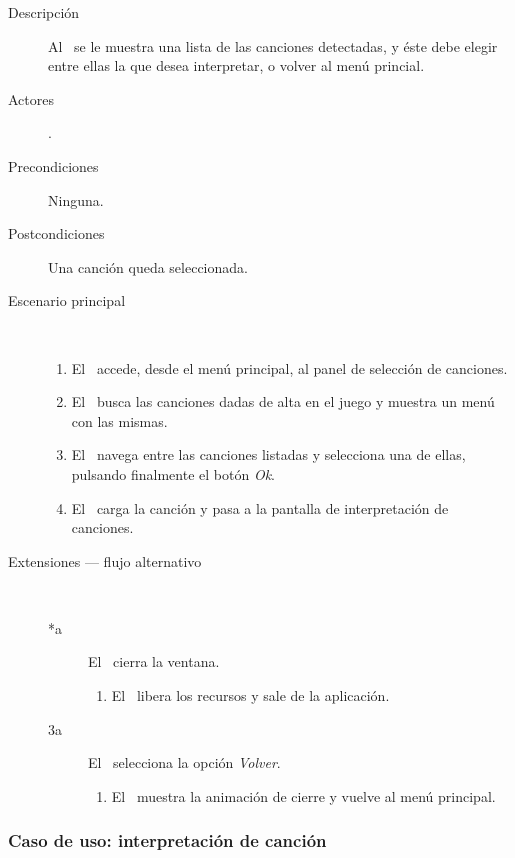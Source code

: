 \begin{description}
\item [Descripción] Al \jugador\ se le muestra una lista de las canciones
  detectadas, y éste debe elegir entre ellas la que desea interpretar, o volver
  al menú princial.
\item [Actores] \jugador.
\item [Precondiciones] Ninguna.
\item [Postcondiciones] Una canción queda seleccionada.
\item [Escenario principal] $\quad$
  \begin{enumerate}
  \item El \jugador\ accede, desde el menú principal, al panel de selección de canciones.
  \item El \sistema\ busca las canciones dadas de alta en el juego y muestra un menú con las mismas.
  \item El \jugador\ navega entre las canciones listadas y selecciona una de ellas, pulsando finalmente el botón \textit{Ok}.
  \item El \sistema\ carga la canción y pasa a la pantalla de interpretación de canciones.
  \end{enumerate}
\item[Extensiones --- flujo alternativo] $\quad$
  \begin{description}
  \item [*a] El \jugador\ cierra la ventana.
    \begin{enumerate}
    \item El \sistema\ libera los recursos y sale de la aplicación.
    \end{enumerate}
  \item [3a] El \jugador\ selecciona la opción \textit{Volver}.
    \begin{enumerate}
    \item El \sistema\ muestra la animación de cierre y vuelve al menú principal.
    \end{enumerate}
  \end{description}  
\end{description}


\subsubsection{Caso de uso: interpretación de canción}

